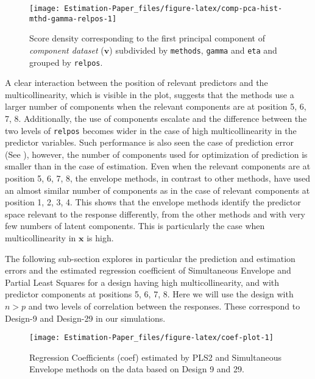 \documentclass[12pt,3p,authoryear]{elsarticle}
\begin{document}
\begin{figure}[!htb]
\texttt{[image: Estimation-Paper\_files/figure-latex/comp-pca-hist-mthd-gamma-relpos-1]} \caption{Score density corresponding to the first principal
component of \emph{component dataset} (\(\mathbf{v}\)) subdivided by
\texttt{methods}, \texttt{gamma} and \texttt{eta} and grouped by
\texttt{relpos}.}\label{fig:comp-pca-hist-mthd-gamma-relpos}
\end{figure}

A clear interaction between the position of relevant predictors and the
multicollinearity, which is visible in the plot, suggests that the
methods use a larger number of components when the relevant components
are at position 5, 6, 7, 8. Additionally, the use of components escalate
and the difference between the two levels of \texttt{relpos} becomes
wider in the case of high multicollinearity in the predictor variables.
Such performance is also seen the case of prediction error (See
\citet{rimal2019pred}), however, the number of components used for
optimization of prediction is smaller than in the case of estimation.
Even when the relevant components are at position 5, 6, 7, 8, the
envelope methods, in contrast to other methods, have used an almost
similar number of components as in the case of relevant components at
position 1, 2, 3, 4. This shows that the envelope methods identify the
predictor space relevant to the response differently, from the other
methods and with very few numbers of latent components. This is
particularly the case when multicollinearity in \(\mathbf{x}\) is high.

The following sub-section explores in particular the prediction and
estimation errors and the estimated regression coefficient of
Simultaneous Envelope and Partial Least Squares for a design having high
multicollinearity, and with predictor components at positions 5, 6, 7,
8. Here we will use the design with \(n>p\) and two levels of
correlation between the responses. These correspond to Design-9 and
Design-29 in our simulations.

\begin{figure}
\texttt{[image: Estimation-Paper\_files/figure-latex/coef-plot-1]} \caption{Regression Coefficients (coef) estimated by PLS2 and Simultaneous Envelope methods on the data based on Design 9 and 29.}\label{fig:coef-plot}
\end{figure}
\end{document}
